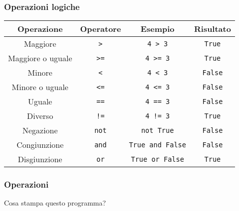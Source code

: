 \begin{contentframe}
    \frametitle{Operazioni logiche}

    \centering
    \begin{tabular}{c|c|c|c}
        Operazione                      & Operatore     & Esempio                   & Risultato         \\
        \midrule
        \midrule
        Maggiore                        & \texttt{>}    & \texttt{4 > 3}            & \texttt{True}     \\
        Maggiore o uguale               & \texttt{>=}   & \texttt{4 >= 3}           & \texttt{True}     \\
        Minore                          & \texttt{<}    & \texttt{4 < 3}            & \texttt{False}    \\
        Minore o uguale                 & \texttt{<=}   & \texttt{4 <= 3}           & \texttt{False}    \\
        Uguale                          & \texttt{==}   & \texttt{4 == 3}           & \texttt{False}    \\
        Diverso                         & \texttt{!=}   & \texttt{4 != 3}           & \texttt{True}     \\
        \midrule
        Negazione                       & \texttt{not}  & \texttt{not True}         & \texttt{False}    \\
        Congiunzione                    & \texttt{and}  & \texttt{True and False}   & \texttt{False}    \\
        Disgiunzione                    & \texttt{or}   & \texttt{True or False}    & \texttt{True}     \\
    \end{tabular}
\end{contentframe}

\begin{exerciseframe}
    \frametitle{Operazioni}

    Cosa stampa questo programma?

    \bigskip
\end{exerciseframe}

